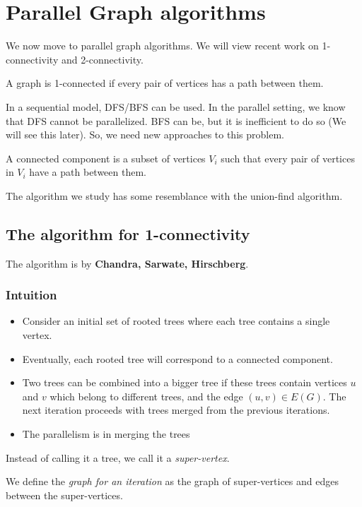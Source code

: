 \chapter{Parallel Graph algorithms}

We now move to parallel graph algorithms. We will view
recent work on 1-connectivity and 2-connectivity.

A graph is 1-connected if every pair of vertices has a path between them.


In a sequential model, DFS/BFS can be used.
In the parallel setting, we know that DFS cannot be parallelized.
BFS can be, but it is inefficient to do so (We will see this later).
So, we need new approaches to this problem.

A connected component is a subset of vertices $V_i$ such that every
pair of vertices in $V_i$ have a path between them.

The algorithm we study has some resemblance with the union-find
algorithm.


\section{The algorithm for 1-connectivity}
The algorithm is by \textbf{Chandra, Sarwate, Hirschberg}.

\subsection{Intuition}
\begin{itemize}
\item Consider an initial set of rooted trees where each tree contains a single vertex.
\item Eventually, each rooted tree will correspond to a connected component.

\item Two trees can be combined into a bigger tree if these trees contain
vertices $u$ and $v$ which belong to different trees, and the edge
$(u, v) \in E(G)$. The next iteration proceeds with trees merged from the previous iterations.

\item The parallelism is in merging the trees
\end{itemize}

Instead of calling it a tree, we call it a \textit{super-vertex}.

We define the \textit{graph for an iteration} as the graph
of super-vertices and edges between the super-vertices.

